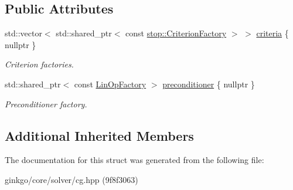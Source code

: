 \subsection*{Public Attributes}
\begin{DoxyCompactItemize}
\item 
\mbox{\label{structgko_1_1solver_1_1Cg_1_1parameters__type_af8544e18d6657180b3a13a98c79e4fa8}} 
std\+::vector$<$ std\+::shared\+\_\+ptr$<$ const \hyperlink{group__stop_gab12a51109c50b35ec36dc5a393d6a9a0}{stop\+::\+Criterion\+Factory} $>$ $>$ \hyperlink{structgko_1_1solver_1_1Cg_1_1parameters__type_af8544e18d6657180b3a13a98c79e4fa8}{criteria} \{ nullptr \}
\begin{DoxyCompactList}\small\item\em Criterion factories. \end{DoxyCompactList}\item 
\mbox{\label{structgko_1_1solver_1_1Cg_1_1parameters__type_ab319c47fc1c31ad73d58c6aac4fdea6f}} 
std\+::shared\+\_\+ptr$<$ const \hyperlink{classgko_1_1LinOpFactory}{Lin\+Op\+Factory} $>$ \hyperlink{structgko_1_1solver_1_1Cg_1_1parameters__type_ab319c47fc1c31ad73d58c6aac4fdea6f}{preconditioner} \{ nullptr \}
\begin{DoxyCompactList}\small\item\em Preconditioner factory. \end{DoxyCompactList}\end{DoxyCompactItemize}
\subsection*{Additional Inherited Members}


The documentation for this struct was generated from the following file\+:\begin{DoxyCompactItemize}
\item 
ginkgo/core/solver/cg.\+hpp (9f8f3063)\end{DoxyCompactItemize}
